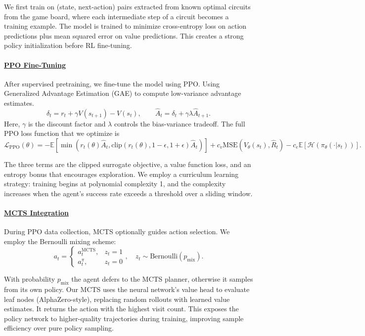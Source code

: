 \documentclass{article} %
\begin{document}
We first train on (state, next-action) pairs extracted from known optimal circuits from the game board, where each intermediate step of a circuit becomes a training example. The model is trained to minimize cross-entropy loss on action predictions plus mean squared error on value predictions. This creates a strong policy initialization before RL fine-tuning.

\paragraph{\underline{PPO Fine-Tuning}}

After supervised pretraining, we fine-tune the model using PPO. Using Generalized Advantage Estimation (GAE) to compute low-variance advantage estimates. $$\delta_t = r_t + \gamma V(s_{t+1}) - V(s_t), \qquad \hat{A}_t = \delta_t + \gamma \lambda \hat{A}_{t+1}.$$
Here, $\gamma$ is the discount factor and $\lambda$ controls the bias-variance tradeoff. The full PPO loss function that we optimize is $$\mathcal{L}_{\text{PPO}}(\theta) = -\mathbb{E}\left[\min\left(r_t(\theta)\hat{A}_t, \text{clip}(r_t(\theta), 1-\epsilon, 1+\epsilon)\hat{A}_t\right)\right] + c_v \text{MSE}(V_\theta(s_t), \hat{R}_t) - c_e \mathbb{E}[\mathcal{H}(\pi_\theta(\cdot|s_t))].$$

The three terms are the clipped surrogate objective, a value function loss, and an entropy bonus that encourages exploration. We employ a curriculum learning strategy: training begins at polynomial complexity 1, and the complexity increases when the agent's success rate exceeds a threshold over a sliding window.

\paragraph{\underline{MCTS Integration}}

During PPO data collection, MCTS optionally guides action selection. We employ the Bernoulli mixing scheme: $$a_t = \begin{cases} a_t^{\text{MCTS}}, & z_t = 1 \\ a_t^{\pi}, & z_t = 0 \end{cases}, \quad z_t \sim \text{Bernoulli}(p_{\text{mix}}).$$

With probability $p_\text{mix}$ the agent defers to the MCTS planner, otherwise it samples from its own policy. Our MCTS uses the neural network's value head to evaluate leaf nodes (AlphaZero-style), replacing random rollouts with learned value estimates. It returns the action with the highest visit count. This exposes the policy network to higher-quality trajectories during training, improving sample efficiency over pure policy sampling.
\end{document}
